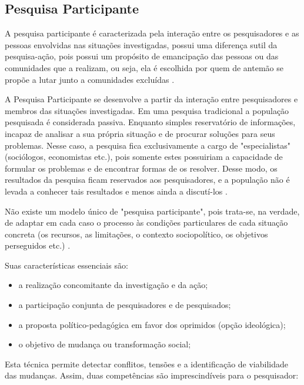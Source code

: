 \newpage

\subsection{Pesquisa Participante}
A pesquisa participante é caracterizada pela interação entre os pesquisadores e as pessoas envolvidas nas situações investigadas, possui uma diferença sutil da pesquisa-ação, pois possui um propósito de emancipação das pessoas ou das comunidades que a realizam, ou seja, ela é escolhida por quem de antemão se propõe a lutar junto a comunidades excluídas \cite{gilNovaes}.

A Pesquisa Participante se desenvolve a partir da interação entre pesquisadores e membros das situações investigadas. Em uma pesquisa tradicional a população pesquisada é considerada passiva. Enquanto simples reservatório de informações, incapaz de analisar a sua própria situação e de procurar soluções para seus problemas. Nesse  caso, a pesquisa fica exclusivamente a cargo de "especialistas" (sociólogos, economistas etc.), pois somente estes possuiriam a capacidade de formular os problemas e de encontrar formas de os resolver. Desse modo, os resultados da pesquisa ficam reservados aos pesquisadores, e a  população não é levada a conhecer tais resultados e menos ainda a discutí-los \cite{leBoterf}.

Não existe um modelo único de "pesquisa participante", pois trata-se, na verdade, de adaptar em cada caso o processo às condições particulares de cada situação concreta (os recursos, as limitações, o contexto sociopolítico, os objetivos perseguidos etc.) \cite{leBoterf}.

Suas características essenciais são:

\begin{itemize}
	\item a realização concomitante da investigação e da ação;
	\item a participação conjunta de pesquisadores e de pesquisados;
	\item a proposta político-pedagógica em favor dos oprimidos (opção ideológica);
	\item o objetivo de mudança ou transformação social;
\end{itemize}

Esta técnica permite detectar conflitos, tensões e a identificação de viabilidade das mudanças. Assim, duas competências são imprescindíveis para o pesquisador:

